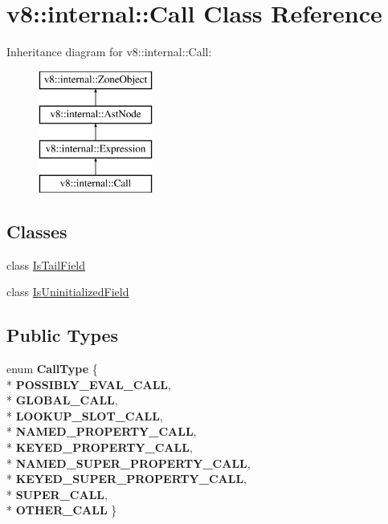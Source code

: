 \hypertarget{classv8_1_1internal_1_1_call}{}\section{v8\+:\+:internal\+:\+:Call Class Reference}
\label{classv8_1_1internal_1_1_call}
Inheritance diagram for v8\+:\+:internal\+:\+:Call\+:\begin{figure}[H]
\begin{center}
\leavevmode
\includegraphics[height=4.000000cm]{classv8_1_1internal_1_1_call}
\end{center}
\end{figure}
\subsection*{Classes}
\begin{DoxyCompactItemize}
\item 
class \hyperlink{classv8_1_1internal_1_1_call_1_1_is_tail_field}{Is\+Tail\+Field}
\item 
class \hyperlink{classv8_1_1internal_1_1_call_1_1_is_uninitialized_field}{Is\+Uninitialized\+Field}
\end{DoxyCompactItemize}
\subsection*{Public Types}
\begin{DoxyCompactItemize}
\item 
enum {\bfseries Call\+Type} \{ \\*
{\bfseries P\+O\+S\+S\+I\+B\+L\+Y\+\_\+\+E\+V\+A\+L\+\_\+\+C\+A\+LL}, 
\\*
{\bfseries G\+L\+O\+B\+A\+L\+\_\+\+C\+A\+LL}, 
\\*
{\bfseries L\+O\+O\+K\+U\+P\+\_\+\+S\+L\+O\+T\+\_\+\+C\+A\+LL}, 
\\*
{\bfseries N\+A\+M\+E\+D\+\_\+\+P\+R\+O\+P\+E\+R\+T\+Y\+\_\+\+C\+A\+LL}, 
\\*
{\bfseries K\+E\+Y\+E\+D\+\_\+\+P\+R\+O\+P\+E\+R\+T\+Y\+\_\+\+C\+A\+LL}, 
\\*
{\bfseries N\+A\+M\+E\+D\+\_\+\+S\+U\+P\+E\+R\+\_\+\+P\+R\+O\+P\+E\+R\+T\+Y\+\_\+\+C\+A\+LL}, 
\\*
{\bfseries K\+E\+Y\+E\+D\+\_\+\+S\+U\+P\+E\+R\+\_\+\+P\+R\+O\+P\+E\+R\+T\+Y\+\_\+\+C\+A\+LL}, 
\\*
{\bfseries S\+U\+P\+E\+R\+\_\+\+C\+A\+LL}, 
\\*
{\bfseries O\+T\+H\+E\+R\+\_\+\+C\+A\+LL}
 \}\hypertarget{classv8_1_1internal_1_1_call_ac6d809a066023f5d0fae3545e3df4fce}{}\label{classv8_1_1internal_1_1_call_ac6d809a066023f5d0fae3545e3df4fce}

\end{DoxyCompactItemize}
